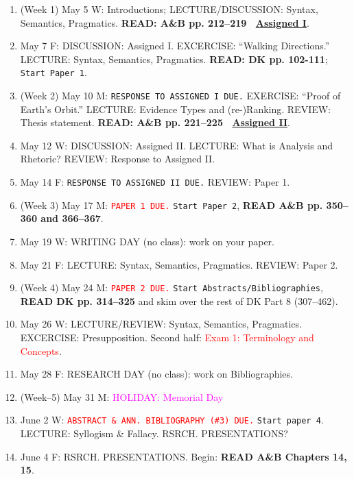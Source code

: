 \documentclass[11pt]{article}
\begin{document}
   \begin{enumerate}

\item (Week 1) May 5 W:  Introductions;  LECTURE/DISCUSSION: Syntax, Semantics, Pragmatics. \textbf{READ: A\&B pp. 212--219 \ \href{http://www.llc.ilstu.edu/dlevere/docs/currentanthroarticle.web.pdf}{Assigned I}}.
\item[] May 7 F: DISCUSSION: Assigned I. EXCERCISE: ``Walking Directions.'' LECTURE: Syntax, Semantics, Pragmatics. \textbf{READ: DK pp. 102-111}; \texttt{Start Paper 1}.

\item (Week 2) May 10 M: \texttt{RESPONSE TO ASSIGNED I DUE.} EXERCISE: ``Proof of Earth's Orbit.'' LECTURE: Evidence Types and (re-)Ranking. REVIEW: Thesis statement. \textbf{READ: A\&B pp. 221--225 \ \href{http://citeseerx.ist.psu.edu/viewdoc/summary?doi=10.1.1.55.8083}{Assigned II}}. 
\item[] May 12 W: DISCUSSION: Assigned II. LECTURE: What is Analysis and Rhetoric? REVIEW: Response to Assigned II.
\item[] May 14 F: \texttt{RESPONSE TO ASSIGNED II DUE.} REVIEW: Paper 1.
 
\item (Week 3) May 17 M: \textcolor{red}{\texttt{PAPER 1 DUE.}} \texttt{Start Paper 2}, \textbf{READ A\&B pp. 350--360 and 366--367}.
\item[] May 19 W: WRITING DAY (no class): work on your paper. 
\item[] May 21 F: LECTURE: Syntax, Semantics, Pragmatics. REVIEW: Paper 2. 

\item (Week 4)  May 24 M: \textcolor{red}{\texttt{PAPER 2 DUE.}} \texttt{Start Abstracts/Bibliographies}, \textbf{READ DK pp. 314--325} and skim over the rest of DK Part 8 (307--462).
\item[] May 26 W: LECTURE/REVIEW: Syntax, Semantics, Pragmatics. EXCERCISE: Presupposition. Second half: \textcolor{red}{Exam 1: Terminology and Concepts}.
\item[] May 28 F: RESEARCH DAY (no class): work on Bibliographies.

\item (Week--5) May 31 M: \textcolor{magenta}{HOLIDAY: Memorial Day}
\item[] June 2 W: \textcolor{red}{\texttt{ABSTRACT \& ANN. BIBLIOGRAPHY (\#3) DUE.}} \texttt{Start paper 4}. LECTURE: Syllogism \& Fallacy. RSRCH. PRESENTATIONS? 
\item[] June 4 F: RSRCH. PRESENTATIONS. Begin: \textbf{READ A\&B Chapters 14, 15}.


\end{enumerate}
\end{document}
